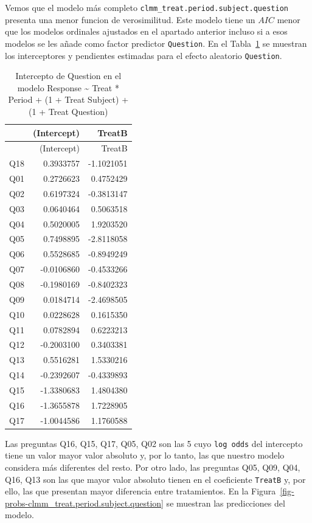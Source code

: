 \documentclass[
  12pt,
  a4paper,
  extrafontsizes,
  onecolumn,
  openright]{memoir}
\begin{document}
\normalsize

Vemos que el modelo más completo
\texttt{clmm\_treat.period.subject.question} presenta una menor funcion
de verosimilitud. Este modelo tiene un \(AIC\) menor que los modelos
ordinales ajustados en el apartado anterior incluso si a esos modelos se
les añade como factor predictor \texttt{Question}. En el
Tabla~\ref{tbl-question-intercepts} se muestran los interceptores y
pendientes estimadas para el efecto aleatorio \texttt{Question}.

\hypertarget{tbl-question-intercepts}{}
\begin{longtable}[]{@{}lrr@{}}
\caption{\label{tbl-question-intercepts}Intercepto de Question en el
modelo Response \textasciitilde{} Treat * Period + (1 + Treat \textbar{}
Subject) + (1 + Treat \textbar{} Question)}\tabularnewline
\toprule\noalign{}
& (Intercept) & TreatB \\
\midrule\noalign{}
\endfirsthead
\toprule\noalign{}
& (Intercept) & TreatB \\
\midrule\noalign{}
\endhead
\bottomrule\noalign{}
\endlastfoot
Q18 & 0.3933757 & -1.1021051 \\
Q01 & 0.2726623 & 0.4752429 \\
Q02 & 0.6197324 & -0.3813147 \\
Q03 & 0.0640464 & 0.5063518 \\
Q04 & 0.5020005 & 1.9203520 \\
Q05 & 0.7498895 & -2.8118058 \\
Q06 & 0.5528685 & -0.8949249 \\
Q07 & -0.0106860 & -0.4533266 \\
Q08 & -0.1980169 & -0.8402323 \\
Q09 & 0.0184714 & -2.4698505 \\
Q10 & 0.0228628 & 0.1615350 \\
Q11 & 0.0782894 & 0.6223213 \\
Q12 & -0.2003100 & 0.3403381 \\
Q13 & 0.5516281 & 1.5330216 \\
Q14 & -0.2392607 & -0.4339893 \\
Q15 & -1.3380683 & 1.4804380 \\
Q16 & -1.3655878 & 1.7228905 \\
Q17 & -1.0044586 & 1.1760588 \\
\end{longtable}

Las preguntas Q16, Q15, Q17, Q05, Q02 son las 5 cuyo \texttt{log\ odds}
del intercepto tiene un valor mayor valor absoluto y, por lo tanto, las
que nuestro modelo considera más diferentes del resto. Por otro lado,
las preguntas Q05, Q09, Q04, Q16, Q13 son las que mayor valor absoluto
tienen en el coeficiente \texttt{TreatB} y, por ello, las que presentan
mayor diferencia entre tratamientos. En la
Figura~\ref{fig-probs-clmm_treat.period.subject.question} se muestran
las predicciones del modelo.
\end{document}
